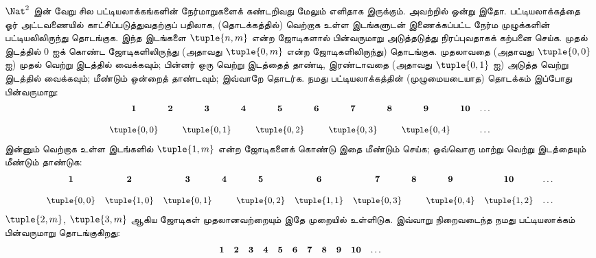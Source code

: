\documentclass[../../../include/open-logic-section]{subfiles}
\begin{document}


\begin{explain}
$\Nat^2$ இன் வேறு சில பட்டியலாக்கங்களின் நேர்மாறுகளைக் கண்டறிவது
மேலும் எளிதாக இருக்கும். அவற்றில் ஒன்று இதோ.
பட்டியலாக்கத்தை ஓர் அட்டவணையில் காட்சிப்படுத்துவதற்குப் பதிலாக,
(தொடக்கத்தில்) வெற்றாக உள்ள இடங்களுடன் இணைக்கப்பட்ட நேர்ம முழுக்களின்
பட்டியலிலிருந்து தொடங்குக.
இந்த இடங்களை $\tuple{n,m}$ என்ற ஜோடிகளால் பின்வருமாறு
அடுத்தடுத்து நிரப்புவதாகக் கற்பனை செய்க.
முதல் இடத்தில் $0$ ஐக் கொண்ட ஜோடிகளிலிருந்து
(அதாவது $\tuple{0,m}$ என்ற ஜோடிகளிலிருந்து) தொடங்குக.
முதலாவதை (அதாவது $\tuple{0,0}$ ஐ) முதல் வெற்று இடத்தில் வைக்கவும்;
பின்னர் ஒரு வெற்று இடத்தைத் தாண்டி,
இரண்டாவதை (அதாவது $\tuple{0,1}$ ஐ) அடுத்த வெற்று இடத்தில் வைக்கவும்;
மீண்டும் ஒன்றைத் தாண்டவும்; இவ்வாறே தொடர்க.
நமது பட்டியலாக்கத்தின் (முழுமையடையாத) தொடக்கம் இப்போது பின்வருமாறு:
\[\small
\begin{array}{@{}c c c c c c c c c c c@{}}
\mathbf 1 & \mathbf 2 & \mathbf 3 & \mathbf 4 & \mathbf 5 & \mathbf 6 & \mathbf 7 & \mathbf 8 & \mathbf 9 & \mathbf{10} & \dots \\ \\
\tuple{0,0} &  & \tuple{0,1} &  & \tuple{0,2} &  & \tuple{0,3} & & \tuple{0,4} &  & \dots \\
\end{array}
\]
இன்னும் வெற்றாக உள்ள இடங்களில் $\tuple{1,m}$ என்ற ஜோடிகளைக் கொண்டு
இதை மீண்டும் செய்க; ஒவ்வொரு மாற்று வெற்று இடத்தையும் மீண்டும் தாண்டுக:
\[\small
\begin{array}{@{}c c c c c c c c c c c@{}}
\mathbf 1 & \mathbf 2 & \mathbf 3 & \mathbf 4 & \mathbf 5 & \mathbf 6 & \mathbf 7 & \mathbf 8 & \mathbf 9 & \mathbf{10} & \dots \\ \\
\tuple{0,0} & \tuple{1,0} & \tuple{0,1} &  & \tuple{0,2} & \tuple{1,1} &
\tuple{0,3} & & \tuple{0,4} &  \tuple{1,2} & \dots \\
\end{array}
\]
$\tuple{2,m}$, $\tuple{3,m}$ ஆகிய ஜோடிகள் முதலானவற்றையும்
இதே முறையில் உள்ளிடுக.
இவ்வாறு நிறைவடைந்த நமது பட்டியலாக்கம் பின்வருமாறு தொடங்குகிறது:
\[\small
\begin{array}{@{}cc c c c c c c c c c@{}}
\mathbf 1 & \mathbf 2 & \mathbf 3 & \mathbf 4 & \mathbf 5 & \mathbf 6 & \mathbf 7 & \mathbf 8 & \mathbf 9 & \mathbf{10} & \dots \\ \\

\end{array}\]
\end{explain}
\end{document}
